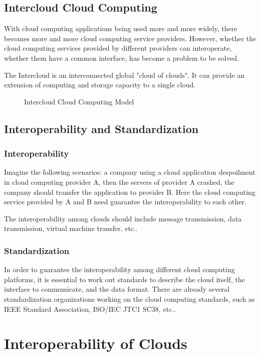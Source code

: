 \documentclass[conference]{IEEEtran}
\begin{document}
\subsection{Intercloud Cloud Computing}
With cloud computing applications being used more and more widely, there becomes more and more cloud computing service providers. However, whether the cloud computing services provided by different providers can interoperate, whether them have a common interface, has become a problem to be solved.

The Intercloud is an interconnected global "cloud of clouds".\cite{interoperability} It can provide an extension of computing and storage capacity to a single cloud.
\begin{figure}[h]
\centering
{}
\caption{Intercloud Cloud Computing Model}
\label{fig_01}
\end{figure}

\subsection{Interoperability and Standardization}
\subsubsection{Interoperability}
Imagine the following scenarios: a company using a cloud application despoilment in cloud computing provider A, then the servers of provider A crashed, the company should transfer the application to provider B. Here the cloud computing service provided by A and B need guarantee the interoperability to each other. 

The interoperability among clouds should include message transmission, data transmission, virtual machine transfer, etc..

\subsubsection{Standardization}
In order to guarantee the interoperability among different cloud computing platforms, it is essential to work out standards to describe the cloud itself, the interface to communicate, and the data format. There are already several standardization organizations working on the cloud computing standards, such as IEEE Standard Association, ISO/IEC JTC1 SC38, etc..


\section{Interoperability of Clouds}
\end{document}
